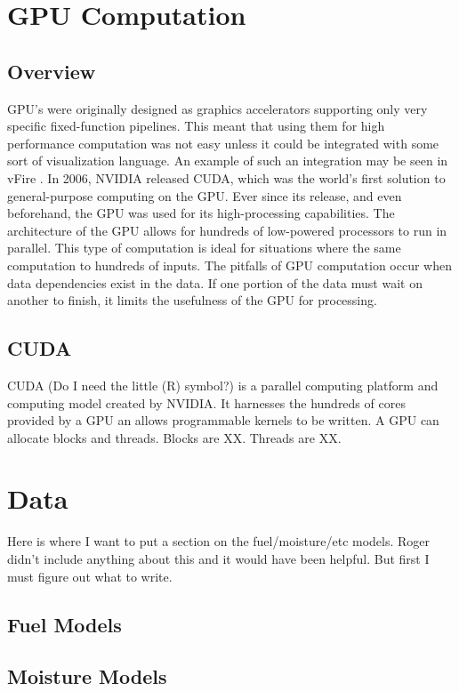 \section{GPU Computation}
\subsection{Overview}
GPU's were originally designed as graphics accelerators supporting only very specific fixed-function pipelines. This meant that using them for high performance computation was not easy unless it could be integrated with some sort of visualization language. An example of such an integration may be seen in vFire \cite{vFire}. In 2006, NVIDIA released CUDA, which was the world's first solution to general-purpose computing on the GPU. Ever since its release, and even beforehand, the GPU was used for its high-processing capabilities. The architecture of the GPU allows for hundreds of low-powered processors to run in parallel. This type of computation is ideal for situations where the same computation to hundreds of inputs. The pitfalls of GPU computation occur when data dependencies exist in the data. If one portion of the data must wait on another to finish, it limits the usefulness of the GPU for processing. 

\subsection{CUDA}
CUDA (Do I need the little (R) symbol?) is a parallel computing platform and computing model created by NVIDIA. It harnesses the hundreds of cores provided by a GPU an allows programmable kernels to be written. A GPU can allocate blocks and threads. Blocks are XX. Threads are XX. 

\section{Data}
Here is where I want to put a section on the fuel/moisture/etc models. Roger didn't include anything about this and it would have been helpful. But first I must figure out what to write. 

\subsection{Fuel Models}
\subsection{Moisture Models}